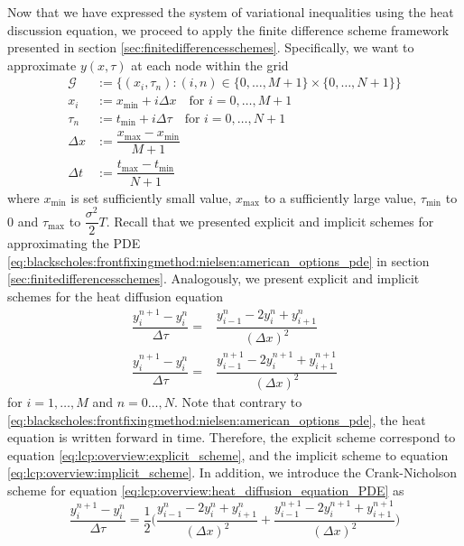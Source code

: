 Now that we have expressed the system of variational inequalities using the heat discussion equation, we proceed to apply the finite difference scheme framework presented in section \ref{sec:finitedifferencesschemes}. Specifically, we want to approximate $y(x, \tau)$ at each node within the grid 
\begin{align}
  \mathcal{G} &:= \{(x_i, \tau_n): (i, n) \in \{0, \dots, M+1\} \times \{0, \dots, N+1\}\}\\
  \label{eq:lcp:overview:grid_2}
  x_i &:= x_{\text{min}} + i\Delta{x} \quad \text{for $i = 0,\dots, M+1$} \\
  \tau_n &:= t_{\text{min}} + i{\Delta{\tau}} \quad \text{for $i = 0,\dots, N+1$} \\
  \Delta{x} &:= \dfrac{x_{\text{max}} - x_{\text{min}}}{M+1} \\ 
  \Delta{t} &:= \dfrac{t_{\text{max}} - t_{\text{min}}}{N+1}
\end{align}
where $x_{\text{min}}$ is set sufficiently small value, $x_{\text{max}}$ to a sufficiently large value, $\tau_{\text{min}}$ to 0 and $\tau_{\text{max}}$ to $\dfrac{\sigma^2}{2}T$. Recall that we presented explicit and implicit schemes for approximating the PDE \eqref{eq:blackscholes:frontfixingmethod:nielsen:american_options_pde} in section \ref{sec:finitedifferencesschemes}. Analogously, we present explicit and implicit schemes for the heat diffusion equation
\begin{align}
  \label{eq:lcp:overview:explicit_scheme}
  \dfrac{y^{n+1}_{i} - y^{n}_{i}}{\Delta \tau} =& \dfrac{y^{n}_{i-1} - 2y^{n}_{i} + y^{n}_{i+1}}{(\Delta x)^2}\\
  \label{eq:lcp:overview:implicit_scheme}
  \dfrac{y^{n+1}_{i} - y^{n}_{i}}{\Delta \tau} =& \dfrac{y^{n+1}_{i-1} - 2y^{n+1}_{i} + y^{n+1}_{i+1}}{(\Delta x)^2}
\end{align}
for $i=1,\dots,M$ and $n=0\dots,N$. Note that contrary to \eqref{eq:blackscholes:frontfixingmethod:nielsen:american_options_pde}, the heat equation is written forward in time. Therefore, the explicit scheme correspond to equation \eqref{eq:lcp:overview:explicit_scheme}, and the implicit scheme to equation \eqref{eq:lcp:overview:implicit_scheme}. In addition, we introduce the Crank-Nicholson scheme\cite{epperson_2013}\cite{seydel_2009} for equation \eqref{eq:lcp:overview:heat_diffusion_equation_PDE} as 
\begin{equation}
  \label{eq:lcp:overview:crank_nicholson}
  \dfrac{y^{n+1}_{i} - y^{n}_{i}}{\Delta \tau} = \dfrac{1}{2}\bigg(\dfrac{y^{n}_{i-1} - 2y^{n}_{i} + y^{n}_{i+1}}{(\Delta x)^2} + \dfrac{y^{n+1}_{i-1} - 2y^{n+1}_{i} + y^{n+1}_{i+1}}{(\Delta x)^2}\bigg)
\end{equation}
